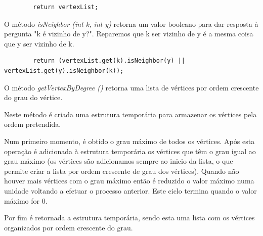 \documentclass[a4paper,12pt]{report}
\begin{document}
\begin{lstlisting}
        return vertexList;
\end{lstlisting}

O método \textit{isNeighbor (int k, int y)} retorna um valor booleano para dar resposta à pergunta "k é vizinho de y?". Reparemos que k ser vizinho de y é a mesma coisa que y ser vizinho de k.

\begin{lstlisting}
        return (vertexList.get(k).isNeighbor(y) || vertexList.get(y).isNeighbor(k));
\end{lstlisting}

O método \textit{getVertexByDegree ()} retorna uma lista de vértices por ordem crescente do grau do vértice.

Neste método é criada uma estrutura temporária para armazenar os vértices pela ordem pretendida.

Num primeiro momento, é obtido o grau máximo de todos os vértices. Após esta operação é adicionada à estrutura temporária os vértices que têm o grau igual ao grau máximo (os vértices são adicionamos sempre ao inicio da lista, o que permite criar a lista por ordem crescente de grau dos vértices). Quando não houver mais vértices com o grau máximo então é reduzido o valor máximo numa unidade voltando a efetuar o processo anterior. Este ciclo termina quando o valor máximo for 0.

Por fim é retornada a estrutura temporária, sendo esta uma lista com os vértices organizados por ordem crescente do grau.
\end{document}
